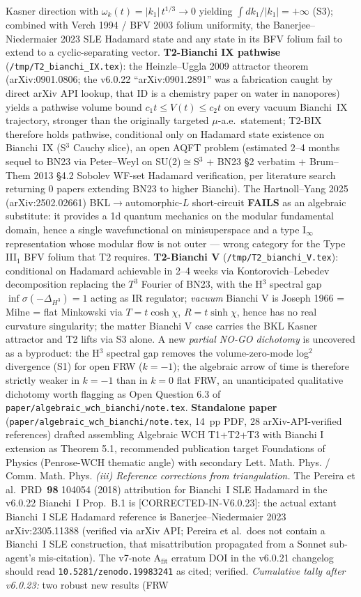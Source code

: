 \documentclass[reprint,amsmath,amssymb,aps,prd,superscriptaddress]{revtex4-2}
\providecommand{\1}{\mathbf{1}}
\begin{document}
Kasner direction with $\omega_k(t)=|k_1|\,t^{1/3}\to 0$ yielding $\int dk_1/|k_1|=+\infty$ (S3); combined with Verch 1994 / BFV 2003 folium uniformity, the Banerjee--Niedermaier 2023 SLE Hadamard state and any state in its BFV folium fail to extend to a cyclic-separating vector. \textbf{T2-Bianchi IX pathwise} (\texttt{/tmp/T2\_bianchi\_IX.tex}): the Heinzle--Uggla 2009 attractor theorem (arXiv:0901.0806; the v6.0.22 ``arXiv:0901.2891'' was a fabrication caught by direct arXiv API lookup, that ID is a chemistry paper on water in nanopores) yields a pathwise volume bound $c_1 t \le V(t) \le c_2 t$ on every vacuum Bianchi~IX trajectory, stronger than the originally targeted $\mu$-a.e.\ statement; T2-BIX therefore holds pathwise, conditional only on Hadamard state existence on Bianchi~IX (S$^3$ Cauchy slice), an open AQFT problem (estimated 2--4 months sequel to BN23 via Peter--Weyl on SU(2)$\cong$S$^3$ + BN23 \S 2 verbatim + Brum--Them 2013 \S 4.2 Sobolev WF-set Hadamard verification, per literature search returning 0 papers extending BN23 to higher Bianchi). The Hartnoll--Yang 2025 (arXiv:2502.02661) BKL$\to$automorphic-$L$ short-circuit \textbf{FAILS} as an algebraic substitute: it provides a 1d quantum mechanics on the modular fundamental domain, hence a single wavefunctional on minisuperspace and a type I$_\infty$ representation whose modular flow is not outer — wrong category for the Type III$_1$ BFV folium that T2 requires. \textbf{T2-Bianchi V} (\texttt{/tmp/T2\_bianchi\_V.tex}): conditional on Hadamard achievable in 2--4 weeks via Kontorovich--Lebedev decomposition replacing the $T^3$ Fourier of BN23, with the H$^3$ spectral gap $\inf\sigma(-\Delta_{H^3})=1$ acting as IR regulator; \emph{vacuum} Bianchi V is Joseph 1966 = Milne = flat Minkowski via $T=t\cosh\chi$, $R=t\sinh\chi$, hence has no real curvature singularity; the matter Bianchi V case carries the BKL Kasner attractor and T2 lifts via S3 alone. A new \emph{partial NO-GO dichotomy} is uncovered as a byproduct: the H$^3$ spectral gap removes the volume-zero-mode log$^2$ divergence (S1) for open FRW ($k=-1$); the algebraic arrow of time is therefore strictly weaker in $k=-1$ than in $k=0$ flat FRW, an unanticipated qualitative dichotomy worth flagging as Open Question 6.3 of \texttt{paper/algebraic\_wch\_bianchi/note.tex}. \textbf{Standalone paper} (\texttt{paper/algebraic\_wch\_bianchi/note.tex}, 14~pp PDF, 28 arXiv-API-verified references) drafted assembling Algebraic WCH T1+T2+T3 with Bianchi I extension as Theorem 5.1, recommended publication target Foundations of Physics (Penrose-WCH thematic angle) with secondary Lett. Math. Phys. / Comm. Math. Phys. \emph{(iii) Reference corrections from triangulation.} The Pereira et al.\ PRD~\textbf{98} 104054 (2018) attribution for Bianchi~I SLE Hadamard in the v6.0.22 Bianchi~I Prop.~B.1 is [CORRECTED-IN-V6.0.23]: the actual extant Bianchi~I SLE Hadamard reference is Banerjee--Niedermaier 2023 arXiv:2305.11388 (verified via arXiv API; Pereira et al.\ does not contain a Bianchi~I SLE construction, that misattribution propagated from a Sonnet sub-agent's mis-citation). The v7-note A$_\mathrm{fit}$ erratum DOI in the v6.0.21 changelog should read \texttt{10.5281/zenodo.19983241} as cited; verified. \emph{Cumulative tally after v6.0.23:} two robust new results (FRW 
\end{document}

